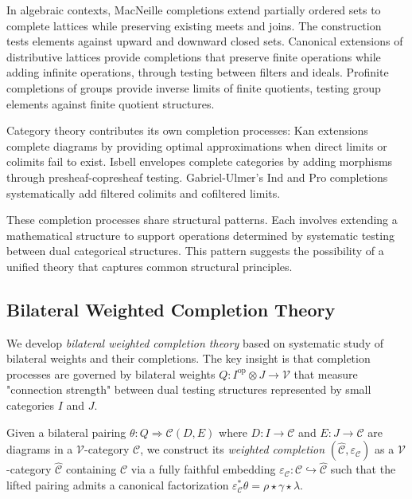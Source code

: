 \documentclass[11pt]{article}
\theoremstyle{plain}
\theoremstyle{definition}
\theoremstyle{remark}
\newcommand{\V}{\mathcal{V}}
\newcommand{\C}{\mathcal{C}}
\newcommand{\op}{\mathrm{op}}
\begin{document}
In algebraic contexts, MacNeille completions \cite{macneille1937extension} extend partially ordered sets to complete lattices while preserving existing meets and joins. The construction tests elements against upward and downward closed sets. Canonical extensions of distributive lattices \cite{jonsson1951boolean} provide completions that preserve finite operations while adding infinite operations, through testing between filters and ideals. Profinite completions \cite{pontryagin1966topological} of groups provide inverse limits of finite quotients, testing group elements against finite quotient structures.

Category theory contributes its own completion processes: Kan extensions \cite{kan1958adjoint} complete diagrams by providing optimal approximations when direct limits or colimits fail to exist. Isbell envelopes \cite{isbell1960adequate} complete categories by adding morphisms through presheaf-copresheaf testing. Gabriel-Ulmer's Ind and Pro completions \cite{gabriel1971lokal} systematically add filtered colimits and cofiltered limits.

These completion processes share structural patterns. Each involves extending a mathematical structure to support operations determined by systematic testing between dual categorical structures. This pattern suggests the possibility of a unified theory that captures common structural principles.

\subsection{Bilateral Weighted Completion Theory}

We develop \emph{bilateral weighted completion theory} based on systematic study of bilateral weights and their completions. The key insight is that completion processes are governed by bilateral weights $Q : I^{\op} \otimes J \to \V$ that measure "connection strength" between dual testing structures represented by small categories $I$ and $J$. 

Given a bilateral pairing $\theta : Q \Rightarrow \C(D,E)$ where $D : I \to \C$ and $E : J \to \C$ are diagrams in a $\V$-category $\C$, we construct its \emph{weighted completion} $(\widehat{\C}, \varepsilon_\C)$ as a $\V$-category $\widehat{\C}$ containing $\C$ via a fully faithful embedding $\varepsilon_\C : \C \hookrightarrow \widehat{\C}$ such that the lifted pairing admits a canonical factorization $\varepsilon_\C^* \theta = \rho \star \gamma \star \lambda$.
\end{document}
